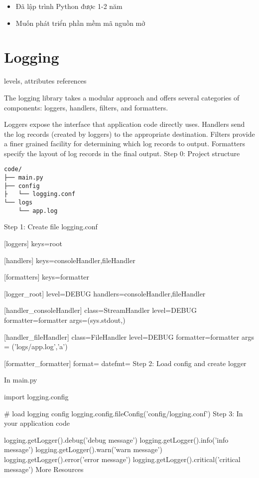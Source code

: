 \begin{itemize}
  \item Đã lập trình Python được 1-2 năm
  \item Muốn phát triển phần mềm mã nguồn mở
\end{itemize}

\section{Logging}

levels, attributes references

The logging library takes a modular approach and offers several categories of components: loggers, handlers, filters, and formatters.

Loggers expose the interface that application code directly uses.
Handlers send the log records (created by loggers) to the appropriate destination.
Filters provide a finer grained facility for determining which log records to output.
Formatters specify the layout of log records in the final output.
Step 0: Project structure

\begin{lstlisting}
code/
├── main.py
├── config
├   └── logging.conf
└── logs
    └── app.log
\end{lstlisting}

Step 1: Create file logging.conf

[loggers]
keys=root

[handlers]
keys=consoleHandler,fileHandler

[formatters]
keys=formatter

[logger_root]
level=DEBUG
handlers=consoleHandler,fileHandler

[handler_consoleHandler]
class=StreamHandler
level=DEBUG
formatter=formatter
args=(sys.stdout,)

[handler_fileHandler]
class=FileHandler
level=DEBUG
formatter=formatter
args = ('logs/app.log','a')

[formatter_formatter]
format=%
datefmt=
Step 2: Load config and create logger

In main.py

import logging.config

# load logging config
logging.config.fileConfig('config/logging.conf')
Step 3: In your application code

logging.getLogger().debug('debug message')
logging.getLogger().info('info message')
logging.getLogger().warn('warn message')
logging.getLogger().error('error message')
logging.getLogger().critical('critical message')
More Resources

